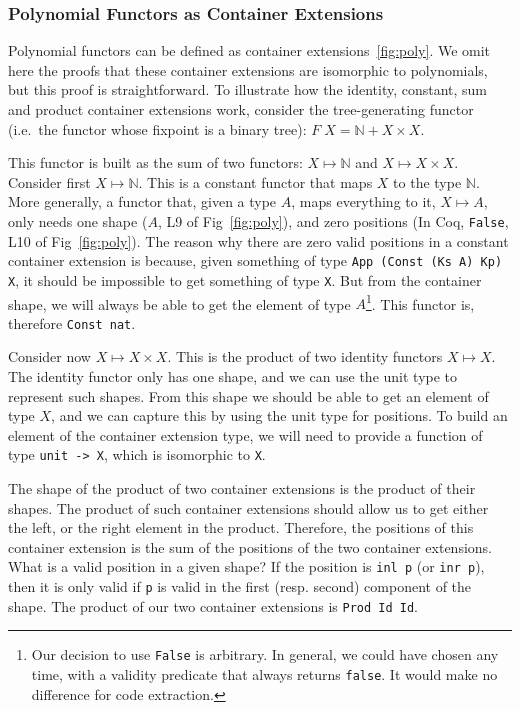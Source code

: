 \documentclass[a4paper, UKenglish, cleveref, autoref, thm-restate]{lipics-v2021}
\begin{document}
\subsubsection{Polynomial Functors as Container Extensions}

Polynomial functors can be defined as container extensions~\ref{fig:poly}. We
omit here the proofs that these container extensions are isomorphic to
polynomials, but this proof is straightforward. To illustrate how the identity,
constant, sum and product container extensions work, consider the
tree-generating functor (i.e.\ the functor whose fixpoint is a binary tree):
$F\; X = \mathbb{N} + X \times X$.

This functor is built as the sum of two functors: $X \mapsto \mathbb{N}$ and $X \mapsto
X \times X$. Consider first $X \mapsto \mathbb{N}$. This is a constant functor
that maps $X$ to the type $\mathbb{N}$. More generally, a functor that, given a
type $A$, maps everything to it, $X \mapsto A$, only needs one shape ($A$, L9
of Fig~\ref{fig:poly}), and zero positions (In Coq, \texttt{False},
L10 of Fig~\ref{fig:poly}). The reason why there are zero valid positions in
a constant container extension is because, given something of type 
\texttt{App (Const (Ks A) Kp) X}, it should be impossible to get
something of type \texttt{X}. But from the container shape, we will
always be able to get the element of type $A$\footnote{%
  Our decision to use \texttt{False} is arbitrary. In general, we
  could have chosen any time, with a validity predicate that always returns
  \texttt{false}. It would make no difference for code extraction.
}. This functor is, therefore \texttt{Const nat}.

Consider now $X \mapsto X \times X$. This is the product of two
identity functors $X \mapsto X$. The identity functor only has one shape, and
we can use the unit type to represent such shapes. From this shape we should be
able to get an element of type $X$, and we can capture this by using the unit
type for positions. To build an element of the container extension type, we
will need to provide a function of type \texttt{unit -> X}, which is
isomorphic to \texttt{X}. 

The shape of the product of two container extensions is the product of their
shapes. The product of such container extensions should allow us to get either
the left, or the right element in the product. Therefore, the positions of this
container extension is the sum of the positions of the two container
extensions. What is a valid position in a given shape? If the position is
\texttt{inl p} (or \texttt{inr p}), then it is only valid if
\texttt{p} is valid in the first (resp. second) component of the
shape. The product of our two container extensions is
\texttt{Prod Id Id}. 
\end{document}
